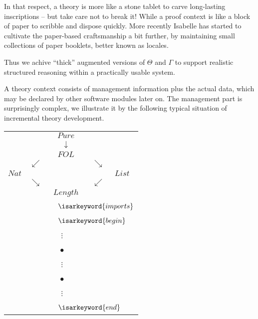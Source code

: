 \begin{isabellebody}
\begin{isamarkuptext}
In that respect, a theory is more like a stone tablet to carve long-lasting
inscriptions -- but take care not to break it!  While a proof context is like
a block of paper to scribble and dispose quickly.  More recently Isabelle has
started to cultivate the paper-based craftsmanship a bit further, by
maintaining small collections of paper booklets, better known as locales.

Thus we achive ``thick'' augmented versions of {\boldmath$\Theta$} and
{\boldmath$\Gamma$} to support realistic structured reasoning within a
practically usable system.%
\end{isamarkuptext}%
\isamarkuptrue%
%
\endisatagFIXME
{\isafoldFIXME}%
%
\isadelimFIXME
%
\endisadelimFIXME
%
\isamarkuptrue%
%
\isadelimFIXME
%
\endisadelimFIXME
%
\isatagFIXME
%
\begin{isamarkuptext}%
A theory context consists of management information plus the
actual data, which may be declared by other software modules later on.
The management part is surprisingly complex, we illustrate it by the
following typical situation of incremental theory development.

\begin{tabular}{rcccl}
        &            & $Pure$ \\
        &            & $\downarrow$ \\
        &            & $FOL$ \\
        & $\swarrow$ &              & $\searrow$ & \\
  $Nat$ &            &              &            & $List$ \\
        & $\searrow$ &              & $\swarrow$ \\
        &            & $Length$ \\
        &            & \multicolumn{3}{l}{~~$\isarkeyword{imports}$} \\
        &            & \multicolumn{3}{l}{~~$\isarkeyword{begin}$} \\
        &            & $\vdots$~~ \\
        &            & $\bullet$~~ \\
        &            & $\vdots$~~ \\
        &            & $\bullet$~~ \\
        &            & $\vdots$~~ \\
        &            & \multicolumn{3}{l}{~~$\isarkeyword{end}$} \\
\end{tabular}


\end{isamarkuptext}
\end{isabellebody}
